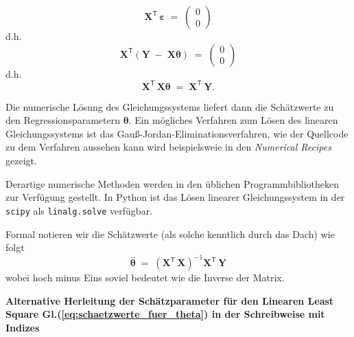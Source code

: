 \begin{equation}
\mathbf{X}^\mathsf{T} \, \boldsymbol{\varepsilon} \; = \;
\left(
\begin{array}{c}
0\\
0
\end{array}
\right)
\end{equation}
d.h.
\begin{equation}
\mathbf{X}^\mathsf{T}\left(\mathbf{Y}
\; - \;
\mathbf{X}\boldsymbol{\theta}\right) \; = \;
\left(
\begin{array}{c}
0\\
0
\end{array}
\right)
\end{equation}
d.h.
\begin{equation}
\mathbf{X}^\mathsf{T}  \, \mathbf{X} \boldsymbol{\theta} \; = \;
\mathbf{X}^\mathsf{T} \, \mathbf{Y} .
\end{equation}

Die numerische Lösung des Gleichungssystems liefert dann die Schätzwerte zu
den Regressionsparametern $\boldsymbol{\theta}$. Ein mögliches Verfahren zum
Lösen des linearen Gleichungssystems ist das Gauß-Jordan-Eliminationsverfahren, wie der Quellcode zu dem Verfahren aussehen kann wird beispielsweie in den \textsl{Numerical Recipes} \cite{Fla02} gezeigt.

Derartige numerische Methoden werden in den üblichen Programmbibliotheken zur Verfügung gestellt. In Python ist das Lösen linearer Gleichungssystem in der \texttt{scipy} als \texttt{linalg.solve} verfügbar.

Formal notieren wir die Schätzwerte (als solche kenntlich durch das Dach) wie folgt
\begin{equation}
\boldsymbol{\hat \theta} \; = \;
\left( \mathbf{X}^\mathsf{T}  \, \mathbf{X} \right)^{-1} \mathbf{X}^\mathsf{T} \, \mathbf{Y}
\label{eq:schaetzwerte_fuer_theta}
\end{equation}
wobei hoch minus Eins soviel bedeutet wie die Inverse der Matrix.

\textbf{Alternative Herleitung der Schätzparameter für den Linearen Least Square Gl.(\ref{eq:schaetzwerte_fuer_theta}) in der Schreibweise mit Indizes}

